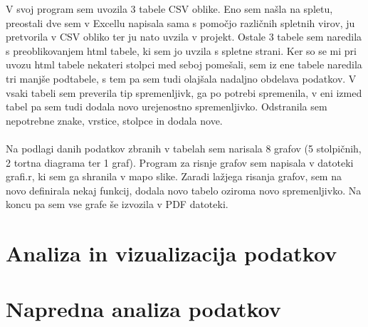 \documentclass[11pt,a4paper]{article}
\begin{document}
V svoj program sem uvozila 3 tabele CSV oblike. Eno sem našla na spletu, preostali dve sem v Excellu napisala sama s pomočjo različnih spletnih virov, ju pretvorila v CSV obliko ter ju nato uvzila v projekt. Ostale 3 tabele sem naredila s preoblikovanjem html tabele, ki sem jo uvzila s spletne strani. Ker so se mi pri uvozu html tabele nekateri stolpci med seboj pomešali, sem iz ene tabele naredila tri manjše podtabele, s tem pa sem tudi olajšala nadaljno obdelava podatkov. V vsaki tabeli sem preverila tip spremenljivk, ga po potrebi spremenila, v eni izmed tabel pa sem tudi dodala novo urejenostno spremenljivko. Odstranila sem nepotrebne znake, vrstice, stolpce in dodala nove. 
\\
\\
Na podlagi danih podatkov zbranih v tabelah sem narisala 8 grafov (5 stolpičnih, 2 tortna diagrama ter 1 graf).
Program za risnje grafov sem napisala v datoteki grafi.r, ki sem ga shranila v mapo slike. Zaradi lažjega risanja grafov, sem na novo definirala nekaj funkcij, dodala novo tabelo oziroma novo spremenljivko.
Na koncu pa sem vse grafe še izvozila v PDF datoteki.



\section{Analiza in vizualizacija podatkov}


\section{Napredna analiza podatkov}

\end{document}
